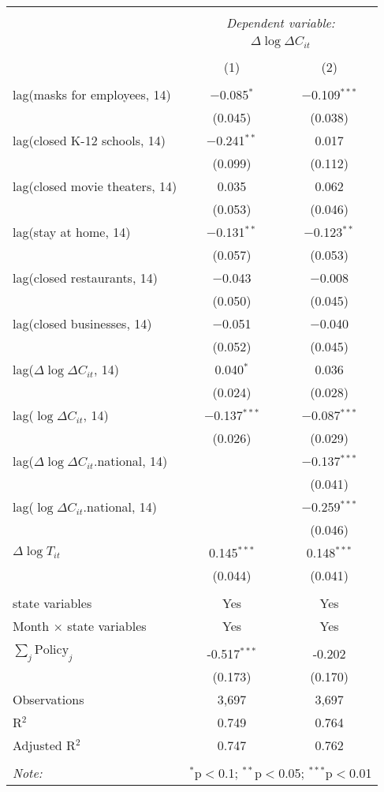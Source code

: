 \begin{tabular}{@{\extracolsep{1pt}}lcc} 
\\[-1.8ex]\hline 
\hline \\[-1.8ex] 
 & \multicolumn{2}{c}{\textit{Dependent variable:}} \\ 
\cline{2-3} 
 & \multicolumn{2}{c}{$\Delta \log \Delta C_{it}$} \\ 
\\[-1.8ex] & (1) & (2)\\ 
\hline \\[-1.8ex] 
 lag(masks for employees, 14) & $-$0.085$^{*}$ & $-$0.109$^{***}$ \\ 
  & (0.045) & (0.038) \\ 
  lag(closed K-12 schools, 14) & $-$0.241$^{**}$ & 0.017 \\ 
  & (0.099) & (0.112) \\ 
  lag(closed movie theaters, 14) & 0.035 & 0.062 \\ 
  & (0.053) & (0.046) \\ 
  lag(stay at home, 14) & $-$0.131$^{**}$ & $-$0.123$^{**}$ \\ 
  & (0.057) & (0.053) \\ 
  lag(closed restaurants, 14) & $-$0.043 & $-$0.008 \\ 
  & (0.050) & (0.045) \\ 
  lag(closed businesses, 14) & $-$0.051 & $-$0.040 \\ 
  & (0.052) & (0.045) \\ 
  lag($\Delta \log \Delta C_{it}$, 14) & 0.040$^{*}$ & 0.036 \\ 
  & (0.024) & (0.028) \\ 
  lag($\log \Delta C_{it}$, 14) & $-$0.137$^{***}$ & $-$0.087$^{***}$ \\ 
  & (0.026) & (0.029) \\ 
  lag($\Delta \log \Delta C_{it}$.national, 14) &  & $-$0.137$^{***}$ \\ 
  &  & (0.041) \\ 
  lag($\log \Delta C_{it}$.national, 14) &  & $-$0.259$^{***}$ \\ 
  &  & (0.046) \\ 
  $\Delta \log T_{it}$ & 0.145$^{***}$ & 0.148$^{***}$ \\ 
  & (0.044) & (0.041) \\ 
 \hline \\[-1.8ex] 
state variables & Yes & Yes \\ 
Month $\times$ state variables & Yes & Yes \\ 
\hline \\[-1.8ex] 
$\sum_j \mathrm{Policy}_j$ & -0.517$^{***}$ & -0.202 \\ 
 & (0.173) & (0.170) \\ 
Observations & 3,697 & 3,697 \\ 
R$^{2}$ & 0.749 & 0.764 \\ 
Adjusted R$^{2}$ & 0.747 & 0.762 \\ 
\hline 
\hline \\[-1.8ex] 
\textit{Note:}  & \multicolumn{2}{r}{$^{*}$p$<$0.1; $^{**}$p$<$0.05; $^{***}$p$<$0.01} \\ 
\end{tabular} 